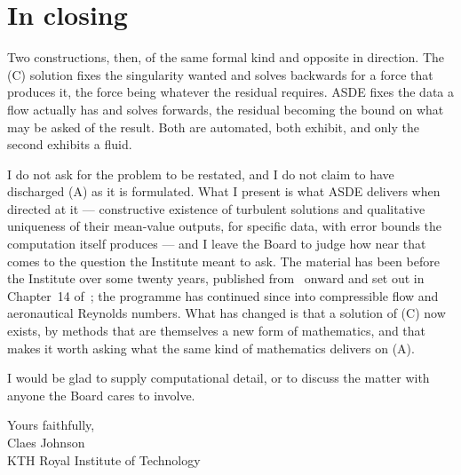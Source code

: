 \documentclass[11pt]{article}
\begin{document}
\section{In closing}

Two constructions, then, of the same formal kind and opposite in direction. The (C) solution fixes
the singularity wanted and solves backwards for a force that produces it, the force being whatever
the residual requires. ASDE fixes the data a flow actually has and solves forwards, the residual
becoming the bound on what may be asked of the result. Both are automated, both exhibit, and only
the second exhibits a fluid.

I do not ask for the problem to be restated, and I do not claim to have discharged (A) as it is
formulated. What I present is what ASDE delivers when directed at it --- constructive existence of
turbulent solutions and qualitative uniqueness of their mean-value outputs, for specific data, with
error bounds the computation itself produces --- and I leave the Board to judge how near that comes
to the question the Institute meant to ask. The material has been
before the Institute over some twenty years, published from~\cite{newapproach} onward and set out
in Chapter~14 of~\cite{cfd}; the programme has continued since into compressible flow and
aeronautical Reynolds numbers. What has changed is that a solution of (C) now exists, by methods
that are themselves a new form of mathematics, and that makes it worth asking what the same kind of
mathematics delivers on (A).

I would be glad to supply computational detail, or to discuss the matter with anyone the Board
cares to involve.

\medskip
\noindent Yours faithfully,\\[2em]
\noindent Claes Johnson\\
\noindent KTH Royal Institute of Technology
\end{document}
